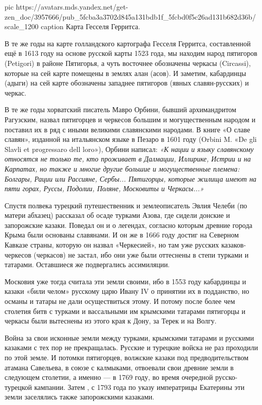 \ifcmt
  pic https://avatars.mds.yandex.net/get-zen_doc/3957666/pub_5fcba3a3702d845a131bdb1f_5fcbd0f5c26ad131b682d36b/scale_1200
	caption Карта Гесселя Герритса.
\fi

В те же годы на карте голландского картографа Гесселя Герритса, составленной
ещё в 1613 году на основе русской карты 1523 года, мы находим народ пятигоров
(Petigori) в районе Пятигорья, а чуть восточнее обозначены черкасы (Circassi),
которые на сей карте помещены в землях алан (асов). И заметим, кабардинцы
(адыги) на сей карте обозначены западнее пятигоров (явных славян-русских) и
черкас.

В те же годы хорватский писатель Мавро Орбини, бывший архимандритом Рагузским,
назвал пятигорцев и черкесов большим и могущественным народом и поставил их в
ряд с иными великими славянскими народами. В книге «О славе славян», изданной
на итальянском языке в Пезаро в 1601 году (Orbini M. «De gli Slavli et
progressaro dell loro»), Орбини написал: \emph{«К нации и языку славянскому относятся
не только те, кто проживает в Далмации, Иллирике, Истрии и на Карпатах, но
также и многие другие большие и могущественные племена: Болгары, Рации или
Рассияне, Сербы... Пятигорцы, которые жилища имеют на пяти горах, Руссы,
Подолии, Поляне, Московиты и Черкасы...»}

Спустя полвека турецкий путешественник и землеописатель Эвлия Челеби (по матери
абхазец) рассказал об осаде турками Азова, где сидели донские и запорожские
казаки. Поведал он и о легендах, согласно которым древние города Крыма были
основаны славянами. И он же в 1666 году достиг на Северном Кавказе страны,
которую он назвал «Черкесией», но там уже русских казаков-черкесов (черкасов)
не застал, ибо они уже были оттеснены в степи турками и татарами. Оставшиеся же
подвергались ассимиляции.

Московия уже тогда считала эти земли своими, ибо в 1553 году кабардинцы и
казаки «били челом» русскому царю Ивану IV о принятии их в подданство, но
османы и татары не дали осуществиться этому. И потому после более чем столетия
битв с турками и вассальными им крымскими татарами пятигорцы и черкасы были
вытеснены из этого края к Дону, за Терек и на Волгу.

Война за свои исконные земли между турками, крымскими татарами и русскими
казаками с тех пор не прекращалась. Русские и турецкие войска не раз проходили
по этой земле. И потомки пятигорцев, волжские казаки под предводительством
атамана Савельева, в союзе с калмыками, отвоевали свои древние земли в
следующем столетии, а именно — в 1769 году, во время очередной русско-турецкой
кампании. Затем , с 1793 года по указу императрицы Екатерины эти земли
заселялись также запорожскими казаками.

